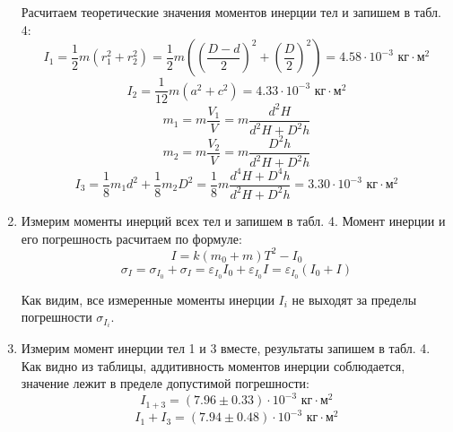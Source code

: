 \documentclass[a4paper, 10pt]{article}%
\begin{document}
\begin{enumerate}
		Расчитаем теоретические значения моментов инерции тел и запишем в табл. 4:
		\[I_1 = \frac{1}{2}m\left(r_1^2+r_2^2\right) = \frac{1}{2}m\left(\left(\frac{D - d}{2}\right)^2 + \left(\frac{D}{2}\right)^2\right) = 4.58 \cdot 10^{-3} \text{ кг}\cdot\text{м}^2\]
		\[I_2 = \frac{1}{12}m\left(a^2+c^2\right) =  4.33 \cdot 10^{-3} \text{ кг}\cdot\text{м}^2\]
		\newpage
		\[m_1 = m\dfrac{V_1}{V} = m\dfrac{d^2H}{d^2H+D^2h}\]
		\[m_2 = m\dfrac{V_2}{V} = m\dfrac{D^2h}{d^2H+D^2h}\]
		\[I_3 = \frac{1}{8}m_1d^2 + \frac{1}{8}m_2D^2 = \dfrac{1}{8}m\dfrac{d^4H + D^4h}{d^2H+D^2h} = 3.30 \cdot 10^{-3} \text{ кг}\cdot\text{м}^2\] 
		\item Измерим моменты инерций всех тел и запишем в табл. 4. Момент инерции и его погрешность расчитаем по формуле:
		\[I = k(m_0+m)T^2 - I_0\]
		\[\sigma_I = \sigma_{I_0} + \sigma_{I} = \varepsilon_{I_0}I_0 + \varepsilon_{I_0}I = \varepsilon_{I_0} (I_0 + I)\]
		
		Как видим, все измеренные моменты инерции $I_i$ не выходят за пределы погрешности $\sigma_{I_i}$.
		
		\item Измерим момент инерции тел 1 и 3 вместе, результаты запишем в табл. 4. Как видно из таблицы, аддитивность моментов инерции соблюдается, значение лежит в пределе допустимой погрешности:
		\[I_{1+3} = (7.96 \pm 0.33) \cdot 10^{-3} \text{ кг}\cdot\text{м}^2\]
		\[I_1 + I_3 = (7.94 \pm 0.48) \cdot 10^{-3} \text{ кг}\cdot\text{м}^2\]
		

\end{enumerate}
\end{document}
